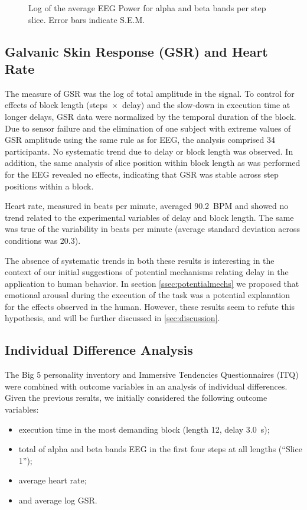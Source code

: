 \begin{figure}[h]
    \centering
    \caption{Log of the average EEG Power for alpha and beta bands per step slice. Error bars indicate S.E.M.}\label{fig:logeegpow:slices}
\end{figure}

\subsection{Galvanic Skin Response (GSR) and Heart Rate}
The measure of GSR was the log of total amplitude in the signal.
To control for effects of block length (steps~\( \times \)~delay) and the slow-down in execution time at longer delays, GSR data were normalized by the temporal duration of the block.
Due to sensor failure and the elimination of one subject with extreme values of GSR amplitude using the same rule as for EEG, the analysis comprised 34 participants.
No systematic trend due to delay or block length was observed.
In addition, the same analysis of slice position within block length as was performed for the EEG revealed no effects, indicating that GSR was stable across step positions within a block. 

Heart rate, measured in beats per minute, averaged \num{90.2}~BPM and showed no trend related to the experimental variables of delay and block length.
The same was true of the variability in beats per minute (average standard deviation across conditions was \num{20.3}).

The absence of systematic trends in both these results is interesting in the context of our initial suggestions of potential mechanisms relating delay in the application to human behavior.
In section \cref{ssec:potentialmechs} we proposed that emotional arousal during the execution of the task was a potential explanation for the effects observed in the human.
However, these results seem to refute this hypothesis, and will be further discussed in \cref{sec:discussion}.

\subsection{Individual Difference Analysis}

The Big 5 personality inventory and Immersive Tendencies Questionnaires (ITQ) were combined with outcome variables in an analysis of individual differences.
Given the previous results, we initially considered the following outcome variables:
\begin{itemize}
    \item execution time in the most demanding block (length 12, delay \SI{3.0}{\second}); 
    \item total of alpha and beta bands EEG in the first four steps at all lengths (``Slice 1'');
    \item average heart rate;
    \item and average log GSR.\@
\end{itemize}

